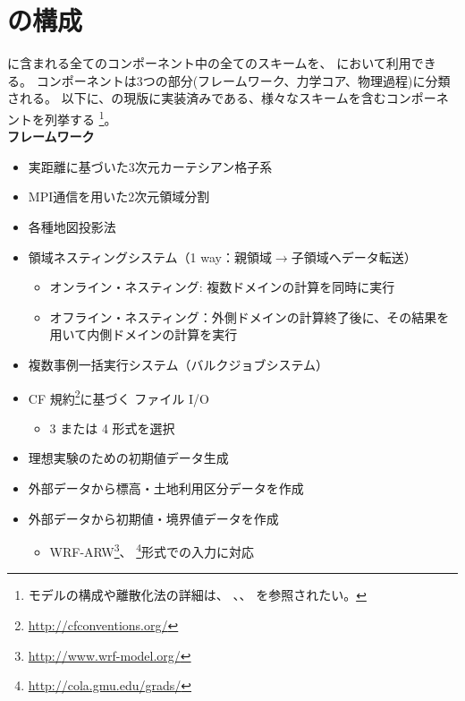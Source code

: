\section{\scalerm の構成}  \label{subsec:sturcture_scale_rm}
\scalelib に含まれる全てのコンポーネント中の全てのスキームを、
\scalerm において利用できる。
コンポーネントは3つの部分(フレームワーク、力学コア、物理過程)に分類される。
以下に、\scalerm の現版に実装済みである、様々なスキームを含むコンポーネントを列挙する%
\footnote{
モデルの構成や離散化法の詳細は、
\citet{scale_2015}、\citet{satoy_2015b}、
\citet{nishizawa_2015}を参照されたい。
}。
\\

{\bf フレームワーク}
\begin{itemize}
 \item 実距離に基づいた3次元カーテシアン格子系
 \item MPI通信を用いた2次元領域分割
 \item 各種地図投影法
 \item 領域ネスティングシステム（1 way：親領域$\to$子領域へデータ転送）
   \begin{itemize}
    \item オンライン・ネスティング: 複数ドメインの計算を同時に実行
    \item オフライン・ネスティング：外側ドメインの計算終了後に、その結果を用いて内側ドメインの計算を実行
   \end{itemize}
 \item 複数事例一括実行システム（バルクジョブシステム）
 \item CF 規約\footnote{\url{http://cfconventions.org/}}に基づく \netcdf ファイル I/O
   \begin{itemize}
   \item {\netcdf}3 または {\netcdf}4 形式を選択
   \end{itemize}
 \item 理想実験のための初期値データ生成
 \item 外部データから標高・土地利用区分データを作成
 \item 外部データから初期値・境界値データを作成
   \begin{itemize}
    \item
      WRF-ARW\footnote{\url{http://www.wrf-model.org/}}、
      \grads \footnote{\url{http://cola.gmu.edu/grads/}}形式での入力に対応
   \end{itemize}
\end{itemize}

